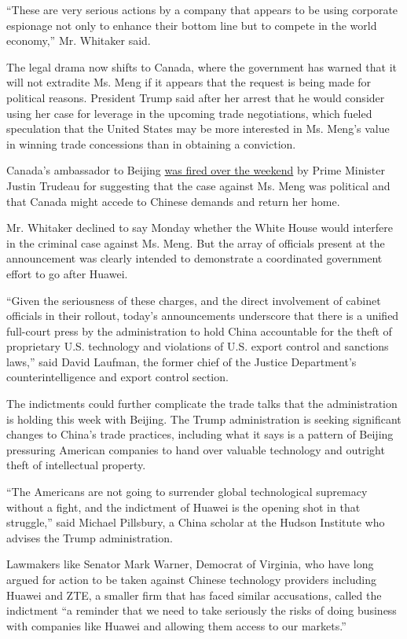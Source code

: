 ``These are very serious actions by a company that appears to be using
corporate espionage not only to enhance their bottom line but to compete
in the world economy,'' Mr. Whitaker said.

The legal drama now shifts to Canada, where the government has warned
that it will not extradite Ms. Meng if it appears that the request is
being made for political reasons. President Trump said after her arrest
that he would consider using her case for leverage in the upcoming trade
negotiations, which fueled speculation that the United States may be
more interested in Ms. Meng's value in winning trade concessions than in
obtaining a conviction.

Canada's ambassador to Beijing
\href{https://www.nytimes.com/2019/01/26/world/americas/canada-ambassador-china-huawei.html}{was
fired over the weekend} by Prime Minister Justin Trudeau for suggesting
that the case against Ms. Meng was political and that Canada might
accede to Chinese demands and return her home.

Mr. Whitaker declined to say Monday whether the White House would
interfere in the criminal case against Ms. Meng. But the array of
officials present at the announcement was clearly intended to
demonstrate a coordinated government effort to go after Huawei.

``Given the seriousness of these charges, and the direct involvement of
cabinet officials in their rollout, today's announcements underscore
that there is a unified full-court press by the administration to hold
China accountable for the theft of proprietary U.S. technology and
violations of U.S. export control and sanctions laws,'' said David
Laufman, the former chief of the Justice Department's
counterintelligence and export control section.

The indictments could further complicate the trade talks that the
administration is holding this week with Beijing. The Trump
administration is seeking significant changes to China's trade
practices, including what it says is a pattern of Beijing pressuring
American companies to hand over valuable technology and outright theft
of intellectual property.

``The Americans are not going to surrender global technological
supremacy without a fight, and the indictment of Huawei is the opening
shot in that struggle,'' said Michael Pillsbury, a China scholar at the
Hudson Institute who advises the Trump administration.

Lawmakers like Senator Mark Warner, Democrat of Virginia, who have long
argued for action to be taken against Chinese technology providers
including Huawei and ZTE, a smaller firm that has faced similar
accusations, called the indictment ``a reminder that we need to take
seriously the risks of doing business with companies like Huawei and
allowing them access to our markets.''


